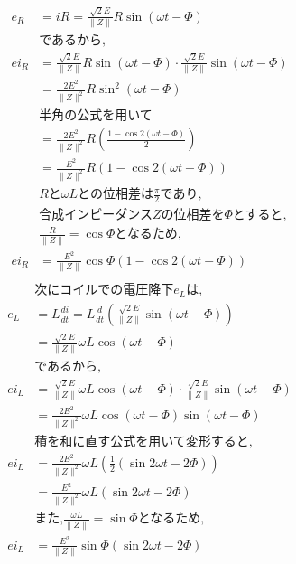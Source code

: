 \documentclass[twocolumn]{article}
\begin{document}
\begin{enumerate}
\begin{align*}
          e_R &= iR = \frac{\sqrt{2}E}{\|Z\|} R \sin \left( \omega t - \Phi\right)\\
          &\text{であるから,}\\
          ei_R&= \frac{\sqrt{2}E}{\|Z\|} R \sin \left( \omega t - \Phi\right) \cdot \frac{\sqrt{2}E}{\|Z\|} \sin \left( \omega t - \Phi\right)\\
              &= \frac{2E^2}{\|Z\|^2} R \sin^2 \left(\omega t - \Phi\right)\\
          &\text{半角の公式を用いて}\\
          &= \frac{2E^2}{\|Z\|^2} R \left( \frac{1-\cos2\left(\omega t - \Phi\right)}{2} \right)\\
          &= \frac{E^2}{\|Z\|^2} R \left( 1-\cos2\left(\omega t - \Phi\right)\right)\\
          &R\text{と}\omega L \text{との位相差は} \frac{\pi}{2} \text{であり,}\\
          &\text{合成インピーダンス}Z\text{の位相差を}\Phi \text{とすると,}\\
          &\frac{R}{\|Z\|} = \cos \Phi \text{となるため,}\\
          ei_R&= \frac{E^2}{\|Z\|} \cos \Phi \left( 1-\cos2\left(\omega t - \Phi\right)\right)\\
    \end{align*}
    \begin{align*}
      &\text{次にコイルでの電圧降下}e_L \text{は,}\\
      e_L &= L \frac{di}{dt} = L \frac{d}{dt} \left( \frac{\sqrt{2}E}{\|Z\|} \sin \left( \omega t - \Phi\right) \right)\\
          &= \frac{\sqrt{2}E}{\|Z\|} \omega L \cos \left(\omega t - \Phi\right)\\
      &\text{であるから,}\\
      ei_L&= \frac{\sqrt{2}E}{\|Z\|}\omega L \cos\left(\omega t - \Phi\right) \cdot \frac{\sqrt{2}E}{\|Z\|} \sin \left( \omega t - \Phi\right)\\
          &= \frac{2E^2}{\|Z\|^2} \omega L \cos\left(\omega t - \Phi\right)\sin\left(\omega t - \Phi\right)\\
      &\text{積を和に直す公式を用いて変形すると,}\\
      ei_L&= \frac{2E^2}{\|Z\|^2}\omega L \left(\frac{1}{2} \left(\sin 2\omega t - 2\Phi\right)\right) \\
          &= \frac{E^2}{\|Z\|^2}\omega L \left(\sin 2\omega t - 2\Phi\right)\\
      &\text{また,} \frac{\omega L}{\|Z\|} = \sin \Phi \text{となるため,}\\
      ei_L&= \frac{E^2}{\|Z\|}\sin \Phi \left(\sin 2\omega t - 2\Phi\right)\\
    \end{align*}


\end{enumerate}
\end{document}
